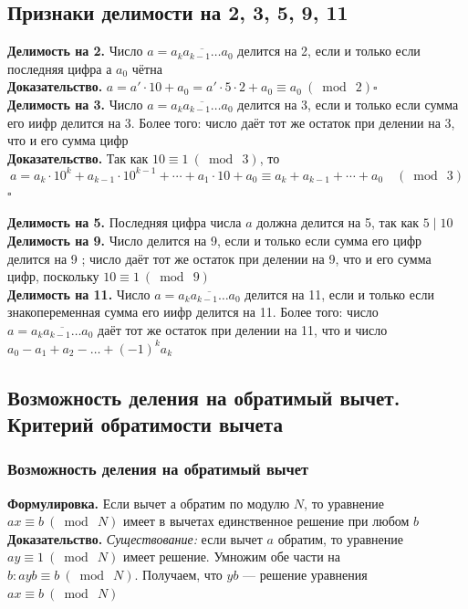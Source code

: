 \documentclass[a4paper]{article}
\newcommand{\qed}{\hfill$\square$}
\begin{document}
\subsection{Признаки делимости на 2, 3, 5, 9, 11}
\textbf{Делимость на 2.} Число $a=\overline{a_{k} a_{k-1} \ldots a_{0}}$ делится на 2, если и только если последняя цифра а $a_{0}$ чётна\\[2mm]
\indent\textbf{Доказательство.} $a=a'\cdot10+a_0 =a'\cdot5\cdot2+a_0\equiv a_0\ (\bmod\ 2)$\qed\\[4mm]

\indent\textbf{Делимость на 3.} Число $a=\overline{a_{k} a_{k-1} \ldots a_{0}}$ делится на 3, если и только если сумма его иифр делится на 3. Более того: число даёт тот же остаток при делении на 3, что и его сумма цифр\\[2mm]
\indent\textbf{Доказательство.} Так как $10 \equiv 1\ (\bmod\ 3)$, то
$$
a=a_{k} \cdot 10^{k}+a_{k-1} \cdot 10^{k-1}+\cdots+a_{1} \cdot 10+a_{0} \equiv a_{k}+a_{k-1}+\cdots+a_{0} \quad(\bmod\ 3)
$$\qed

\indent\textbf{Делимость на 5.} Последняя цифра числа $a$ должна делится на 5, так как $5 \mid 10$\\[4mm]

\indent\textbf{Делимость на 9.} Число делится на 9, если и только если сумма его цифр делится на 9 ; число даёт тот же остаток при делении на 9, что и его сумма цифр, поскольку $10 \equiv 1\ (\bmod\ 9)$\\[4mm]

\indent\textbf{Делимость на 11.} Число $a=\overline{a_{k} a_{k-1} \ldots a_{0}}$ делится на 11, если и только если знакопеременная сумма его иифр делится на 11. Более того: число $a=\overline{a_{k} a_{k-1} \ldots a_{0}}$ даёт тот же остаток при делении на 11, что и число $a_{0}-a_{1}+a_{2}-\ldots+(-1)^{k} a_{k}$

\subsection{Возможность деления на обратимый вычет. Критерий обратимости вычета}
\subsubsection*{Возможность деления на обратимый вычет}
\textbf{Формулировка.} Если вычет а обратим по модулю $N$, то уравнение $a x \equiv b\ (\bmod\ N)$ имеет в вычетах единственное решение при любом $b$\\[2mm]
\indent\textbf{Доказательство.} \textit{Существование:} если вычет $a$ обратим, то уравнение $ay \equiv 1\ (\bmod\ N)$ 
имеет решение. Умножим обе части на $b: a y b \equiv b\ (\bmod\ N)$. Получаем, что $yb$ — решение уравнения 
$a x \equiv b\ (\bmod\ N)$
\end{document}
